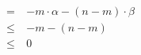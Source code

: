 {\begin{align*}
    =\ & -m \cdot \alpha - (n - m) \cdot \beta \\
    \leq\ & -m -(n-m) \\
    \leq \ & 0

\end{align*}}

